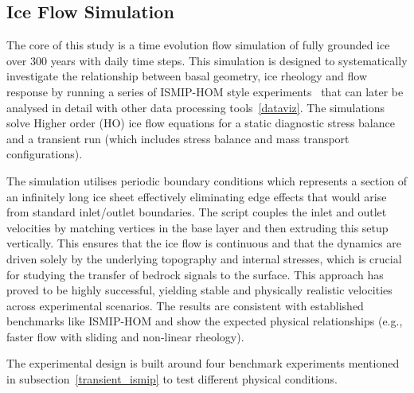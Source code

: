 \subsection{Ice Flow Simulation}
The core of this study is a time evolution flow simulation of fully grounded ice over 300 years with daily time steps. This simulation is designed to systematically investigate the relationship between basal geometry, ice rheology and flow response by running a series of ISMIP-HOM style experiments~\cite{Pattyn_2008} that can later be analysed in detail with other data processing tools~\ref{dataviz}. The simulations solve Higher order (HO) ice flow equations for a static diagnostic stress balance and a transient run (which includes stress balance and mass transport configurations).

The simulation utilises periodic boundary conditions which represents a section of an infinitely long ice sheet effectively eliminating edge effects that would arise from standard inlet/outlet boundaries. The script couples the inlet and outlet velocities by matching vertices in the base layer and then extruding this setup vertically. This ensures that the ice flow is continuous and that the dynamics are driven solely by the underlying topography and internal stresses, which is crucial for studying the transfer of bedrock signals to the surface.
This approach has proved to be highly successful, yielding stable and physically realistic velocities across experimental scenarios. The results are consistent with established benchmarks like ISMIP-HOM and show the expected physical relationships (e.g., faster flow with sliding and non-linear rheology).

The experimental design is built around four benchmark experiments mentioned in subsection~\ref{transient_ismip} to test different physical conditions.










